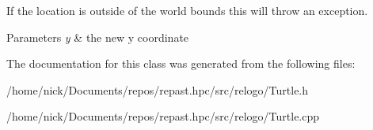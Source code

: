 If the location is outside of the world bounds this will throw an exception.


\begin{DoxyParams}{Parameters}
{\em y} & the new y coordinate \\
\hline
\end{DoxyParams}


The documentation for this class was generated from the following files\-:\begin{DoxyCompactItemize}
\item 
/home/nick/\-Documents/repos/repast.\-hpc/src/relogo/Turtle.\-h\item 
/home/nick/\-Documents/repos/repast.\-hpc/src/relogo/Turtle.\-cpp\end{DoxyCompactItemize}
